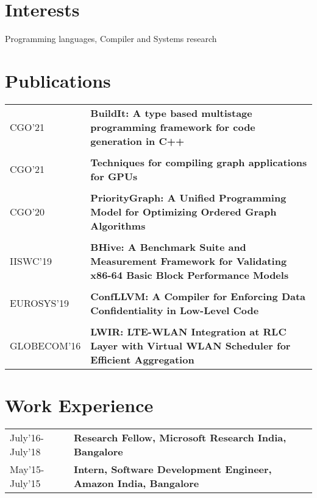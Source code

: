 \documentclass[10pt]{article}
\newcommand \VRule{}
\begin{document}
\section*{Interests}
Programming languages, Compiler and Systems research

\section*{Publications}
\begin{tabular}{l!{\VRule}p{15cm}}

CGO'21 & {\bf BuildIt: A type based multistage programming framework for code generation in C++} \\ \\
CGO'21 & {\bf Techniques for compiling graph applications for GPUs} \\ \\
CGO'20 & {\bf PriorityGraph: A Unified Programming Model for Optimizing Ordered Graph Algorithms} \\ \\ 
IISWC'19 & {\bf BHive: A Benchmark Suite and Measurement Framework for Validating x86-64 Basic Block Performance Models} \\ \\
EUROSYS'19 & {\bf ConfLLVM: A Compiler for Enforcing Data Confidentiality in Low-Level Code} \\ \\
GLOBECOM'16 & {\bf LWIR: LTE-WLAN Integration at RLC Layer with Virtual WLAN Scheduler for Efficient Aggregation } \\
\end{tabular}

\section*{Work Experience}
\begin{tabular}{l!{\VRule}p{15cm}}
July'16-July'18 & {\bf Research Fellow, Microsoft Research India, Bangalore } \\
May'15-July'15 & {\bf Intern, Software Development Engineer, Amazon India, Bangalore } \\
\end{tabular}
\end{document}
